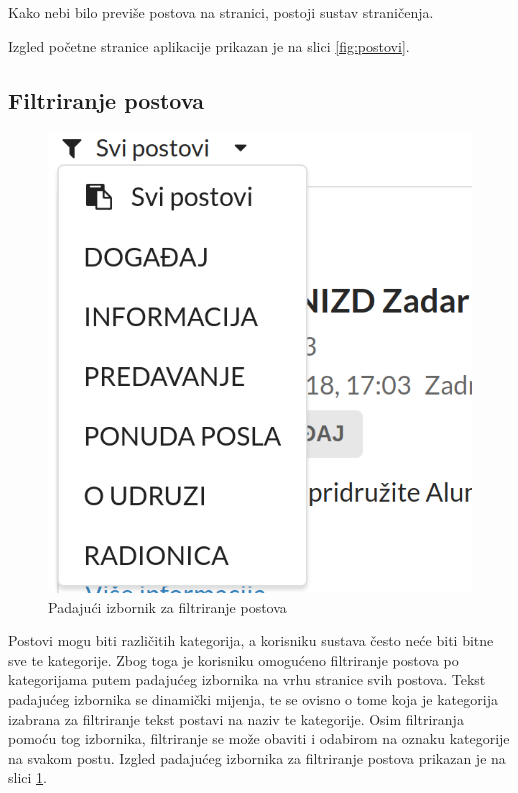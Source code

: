 \documentclass[zavrsni, numeric]{fer}
\begin{document}
Kako nebi bilo previše postova na stranici, postoji sustav straničenja.

Izgled početne stranice aplikacije prikazan je na slici \ref{fig:postovi}.

\subsection{Filtriranje postova}

\begin{figure}[H]
	\centering
	\includegraphics[width=13cm]{slike/filter.png}
	\caption{Padajući izbornik za filtriranje postova}
	\label{fig:filter}
\end{figure}

Postovi mogu biti različitih kategorija, a korisniku sustava često neće biti bitne sve te kategorije. Zbog toga je korisniku omogućeno filtriranje postova po kategorijama putem padajućeg izbornika na vrhu stranice svih postova. Tekst padajućeg izbornika se dinamički mijenja, te se ovisno o tome koja je kategorija izabrana za filtriranje tekst postavi na naziv te kategorije. Osim filtriranja pomoću tog izbornika, filtriranje se može obaviti i odabirom na oznaku kategorije na svakom postu. Izgled padajućeg izbornika za filtriranje postova prikazan je na slici \ref{fig:filter}.
\end{document}
